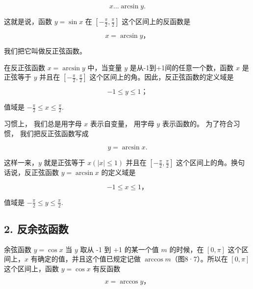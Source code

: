 \[
x \dots \arcsin y.
\]

这就是说，函数 \(y = \sin x\) 在
\(\left[-\frac{\pi}{2}, \frac{\pi}{2}\right]\) 这个区间上的反函数是

\[
x = \arcsin y\text{，}
\]

我们把它叫做反正弦函数。

在反正弦函数 \(x = \arcsin y\) 中，当变量 \(y\)
是从-1到+1间的任意一个数，函数 \(x\) 是正弦等于 \(y\) 并且在
\(\left[-\frac{\pi}{2}, \frac{\pi}{2}\right]\)
这个区间上的角。因此，反正弦函数的定义域是

\[
- 1 \leqslant y \leqslant 1\text{；}
\]

值域是 \(-\frac{\pi}{2} \leqslant x \leqslant \frac{\pi}{2}\).

习惯上， 我们总是用字母 \(x\) 表示自变量， 用字母 \(y\) 表示函数的。
为了符合习惯， 我们把反正弦函数写成

\[
y = \arcsin x.
\]

这样一来，\(y\) 就是正弦等于 \(x(|x| \leqslant 1)\) 并且在
\(\left[-\frac{\pi}{2}, \frac{\pi}{2}\right]\)
这个区间上的角。换句话说，反正弦函数 \(y = \arcsin x\) 的定义域是

\[
- 1 \leqslant x \leqslant 1\text{，}
\]

值域是 \(-\frac{\pi}{2} \leqslant y \leqslant \frac{\pi}{2}\).

\subsection{2. 反余弦函数}

余弦函数 \(y = \cos x\) 当 \(y\) 取从 -1 到 +1 的某一个值 \(m\)
的时候，在 \([0, \pi]\) 这个区间上，\(x\)
有确定的值，并且这个值已规定记做 \(\arccos m\)（图8·7）。所以在
\([0, \pi]\) 这个区间上，函数 \(y = \cos x\) 有反函数

\[
x = \operatorname{arccos} y\text{，}
\]

